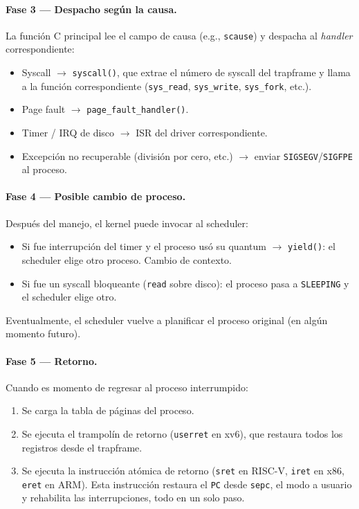 \documentclass[11pt,a4paper]{article}
\begin{document}
\paragraph{Fase 3 --- Despacho según la causa.}

La función C principal lee el campo de causa (e.g., \texttt{scause})
y despacha al \emph{handler} correspondiente:

\begin{itemize}[leftmargin=*,nosep]
    \item Syscall $\to$ \texttt{syscall()}, que extrae el número
        de syscall del trapframe y llama a la función
        correspondiente (\texttt{sys\_read}, \texttt{sys\_write},
        \texttt{sys\_fork}, etc.).
    \item Page fault $\to$ \texttt{page\_fault\_handler()}.
    \item Timer / IRQ de disco $\to$ ISR del driver correspondiente.
    \item Excepción no recuperable (división por cero, etc.) $\to$
        enviar \texttt{SIGSEGV}/\texttt{SIGFPE} al proceso.
\end{itemize}

\paragraph{Fase 4 --- Posible cambio de proceso.}

Después del manejo, el kernel puede invocar al scheduler:

\begin{itemize}[leftmargin=*,nosep]
    \item Si fue interrupción del timer y el proceso usó su quantum
        $\to$ \texttt{yield()}: el scheduler elige otro proceso.
        Cambio de contexto.
    \item Si fue un syscall bloqueante (\texttt{read} sobre disco):
        el proceso pasa a \texttt{SLEEPING} y el scheduler elige
        otro.
\end{itemize}

Eventualmente, el scheduler vuelve a planificar el proceso original
(en algún momento futuro).

\paragraph{Fase 5 --- Retorno.}

Cuando es momento de regresar al proceso interrumpido:

\begin{enumerate}[leftmargin=*]
    \item Se carga la tabla de páginas del proceso.
    \item Se ejecuta el trampolín de retorno (\texttt{userret} en
        xv6), que restaura todos los registros desde el trapframe.
    \item Se ejecuta la instrucción atómica de retorno
        (\texttt{sret} en RISC-V, \texttt{iret} en x86,
        \texttt{eret} en ARM). Esta instrucción restaura el
        \texttt{PC} desde \texttt{sepc}, el modo a usuario y
        rehabilita las interrupciones, todo en un solo paso.
\end{enumerate}
\end{document}

